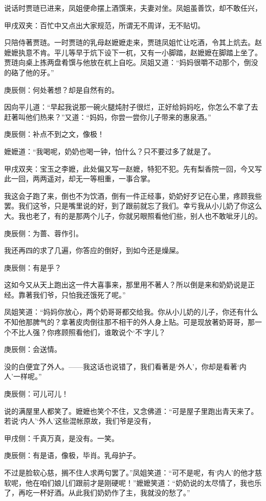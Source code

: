 \begin{parag}
    说话时贾琏已进来，凤姐便命摆上酒馔来，夫妻对坐。凤姐虽善饮，却不敢任兴，\begin{note}甲戌双夹：百忙中又点出大家规范，所谓无不周详，无不贴切。\end{note}只陪侍著贾琏。一时贾琏的乳母赵嬷嬷走来，贾琏凤姐忙让吃酒，令其上炕去。赵嬷嬷执意不肯。平儿等早于炕下设下一杌，又有一小脚踏，赵嬷嬷在脚踏上坐了。贾琏向桌上拣两盘肴馔与他放在杌上自吃。凤姐又道：“妈妈很嚼不动那个，倒没的硌了他的牙。”\begin{note}庚辰侧：何处著想？却是自然有的。\end{note}因向平儿道：“早起我说那一碗火腿炖肘子很烂，正好给妈妈吃，你怎么不拿了去赶著叫他们热来？”又道：“妈妈，你尝一尝你儿子带来的惠泉酒。”\begin{note}庚辰侧：补点不到之文，像极！\end{note}嬷嬷道：“我喝呢，奶奶也喝一钟，怕什么？只不要过多了就是了。\begin{note}甲戌双夹：宝玉之李嬷，此处偏又写一赵嬷，特犯不犯。先有梨香院一回，今又写此一回，两两遥对，却无一等相重，一事合掌。\end{note}我这会子跑了来，倒也不为饮酒，倒有一件正经事，奶奶好歹记在心里，疼顾我些罢。我们这爷，只是嘴里说的好，到了跟前就忘了我们。幸亏我从小儿奶了你这么大。我也老了，有的是那两个儿子，你就另眼照看他们些，别人也不敢呲牙儿的。\begin{note}庚辰侧：为蔷、蓉作引。\end{note}我还再四的求了几遍，你答应的倒好，到如今还是燥屎。\begin{note}庚辰侧：有是乎？\end{note}这如今又从天上跑出这一件大喜事来，那里用不著人？所以倒是来和奶奶说是正经。靠著我们爷，只怕我还饿死了呢。”
\end{parag}


\begin{parag}
    凤姐笑道：“妈妈你放心，两个奶哥哥都交给我。你从小儿奶的儿子，你还有什么不知他那脾气的？拿著皮肉倒往那不相干的外人身上贴。可是现放著奶哥哥，那一个不比人强？你疼顾照看他们，谁敢说个‘不’字儿？\begin{note}庚辰侧：会送情。\end{note}没的白便宜了外人。——我这话也说错了，我们看著是‘外人’，你却是看著‘内人’一样呢。”\begin{note}庚辰侧：可儿可儿！\end{note}说的满屋里人都笑了。嬷嬷也笑个不住，又念佛道：“可是屋子里跑出青天来了。若说‘内人’‘外人’这些混帐原故，我们爷是没有，\begin{note}甲戌侧：千真万真，是没有。一笑。\end{note}\begin{note}庚辰侧：有是语，像极，毕肖。乳母护子。\end{note}不过是脸软心慈，搁不住人求两句罢了。”凤姐笑道：“可不是呢，有‘内人’的他才慈软呢，他在咱们娘儿们跟前才是刚硬呢！”嬷嬷笑道：“奶奶说的太尽情了，我也乐了，再吃一杯好酒。从此我们奶奶作了主，我就没的愁了。”
\end{parag}


